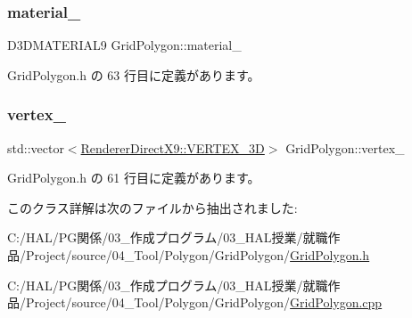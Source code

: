 \mbox{\label{class_grid_polygon_a5aabcb6eed028eb7b093ce8f4e6936a8}} 
\subsubsection{\texorpdfstring{material\+\_\+}{material\_}}
{\footnotesize\ttfamily D3\+D\+M\+A\+T\+E\+R\+I\+A\+L9 Grid\+Polygon\+::material\+\_\+\hspace{0.3cm}{\ttfamily [private]}}



 Grid\+Polygon.\+h の 63 行目に定義があります。

\mbox{\label{class_grid_polygon_a71923f80b111b2868553f9f3600fa192}} 
\subsubsection{\texorpdfstring{vertex\+\_\+}{vertex\_}}
{\footnotesize\ttfamily std\+::vector$<$\mbox{\hyperlink{class_renderer_direct_x9_1_1_v_e_r_t_e_x__3_d}{Renderer\+Direct\+X9\+::\+V\+E\+R\+T\+E\+X\+\_\+3D}}$>$ Grid\+Polygon\+::vertex\+\_\+\hspace{0.3cm}{\ttfamily [private]}}



 Grid\+Polygon.\+h の 61 行目に定義があります。



このクラス詳解は次のファイルから抽出されました\+:\begin{DoxyCompactItemize}
\item 
C\+:/\+H\+A\+L/\+P\+G関係/03\+\_\+作成プログラム/03\+\_\+\+H\+A\+L授業/就職作品/\+Project/source/04\+\_\+\+Tool/\+Polygon/\+Grid\+Polygon/\mbox{\hyperlink{_grid_polygon_8h}{Grid\+Polygon.\+h}}\item 
C\+:/\+H\+A\+L/\+P\+G関係/03\+\_\+作成プログラム/03\+\_\+\+H\+A\+L授業/就職作品/\+Project/source/04\+\_\+\+Tool/\+Polygon/\+Grid\+Polygon/\mbox{\hyperlink{_grid_polygon_8cpp}{Grid\+Polygon.\+cpp}}\end{DoxyCompactItemize}
